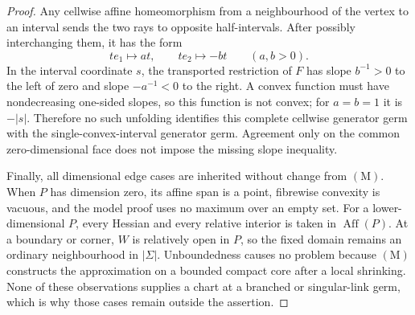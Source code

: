 \begin{proof}
Any cellwise affine homeomorphism from a neighbourhood of the vertex to an
interval sends the two rays to opposite half-intervals.  After possibly
interchanging them, it has the form
\[
                 te_1\longmapsto at,
        \qquad  te_2\longmapsto-bt
        \qquad(a,b>0).
\]
In the interval coordinate \(s\), the transported restriction of \(F\)
has slope \(b^{-1}>0\) to the left of zero and slope \(-a^{-1}<0\) to the
right.  A convex function must have nondecreasing one-sided slopes, so this
function is not convex; for \(a=b=1\) it is \(-|s|\).  Therefore no such
unfolding identifies this complete cellwise generator germ with the
single-convex-interval generator germ.  Agreement only on the common
zero-dimensional face does not impose the missing slope inequality.

Finally, all dimensional edge cases are inherited without change from
\((\mathrm M)\).  When \(P\) has dimension zero, its affine span is a
point, fibrewise convexity is vacuous, and the model proof uses no maximum
over an empty set.  For a lower-dimensional \(P\), every Hessian and every
relative interior is taken in \(\operatorname{Aff}(P)\).  At a boundary or
corner, \(W\) is relatively open in \(P\), so the fixed domain remains an
ordinary neighbourhood in \(|\Sigma|\).  Unboundedness causes no problem
because \((\mathrm M)\) constructs the approximation on a bounded compact
core after a local shrinking.  None of these observations supplies a chart
at a branched or singular-link germ, which is why those cases remain outside
the assertion.
\end{proof}
